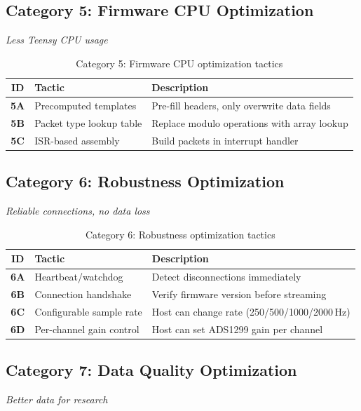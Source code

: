 \documentclass[11pt,a4paper]{article}
\newcommand{\tactic}[1]{\textbf{#1}}
\begin{document}
\subsection{Category 5: Firmware CPU Optimization}
\textit{Less Teensy CPU usage}

\begin{table}[H]
\centering
\small
\begin{tabularx}{\textwidth}{|c|l|X|}
\hline
\textbf{ID} & \textbf{Tactic} & \textbf{Description} \\\hline
\tactic{5A} & Precomputed templates & Pre-fill headers, only overwrite data fields \\
\tactic{5B} & Packet type lookup table & Replace modulo operations with array lookup \\
\tactic{5C} & ISR-based assembly & Build packets in interrupt handler \\
\hline
\end{tabularx}
\caption{Category 5: Firmware CPU optimization tactics}
\end{table}

\subsection{Category 6: Robustness Optimization}
\textit{Reliable connections, no data loss}

\begin{table}[H]
\centering
\small
\begin{tabularx}{\textwidth}{|c|l|X|}
\hline
\textbf{ID} & \textbf{Tactic} & \textbf{Description} \\\hline
\tactic{6A} & Heartbeat/watchdog & Detect disconnections immediately \\
\tactic{6B} & Connection handshake & Verify firmware version before streaming \\
\tactic{6C} & Configurable sample rate & Host can change rate (250/500/1000/2000\,Hz) \\
\tactic{6D} & Per-channel gain control & Host can set ADS1299 gain per channel \\
\hline
\end{tabularx}
\caption{Category 6: Robustness optimization tactics}
\end{table}

\subsection{Category 7: Data Quality Optimization}
\textit{Better data for research}
\end{document}
